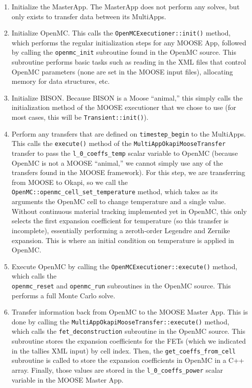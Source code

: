 \documentclass[10pt]{article}
\numberwithin{equation}{section} %
\begin{document}
\begin{enumerate}
\item Initialize the MasterApp. The MasterApp does not perform any solves, but only exists to transfer data between its MultiApps.
\item Initialize OpenMC. This calls the {\tt OpenMCExecutioner::init()} method, which performs the regular initialization steps for any MOOSE App, followed by calling the {\tt openmc\_init} subroutine found in the OpenMC source. This subroutine performs basic tasks such as reading in the XML files that control OpenMC parameters (none are set in the MOOSE input files), allocating memory for data structures, etc.
\item Initialize BISON. Because BISON is a Moose ``animal,'' this simply calls the initialization method of the MOOSE executioner that we chose to use (for most cases, this will be {\tt Transient::init()}).
\item Perform any transfers that are defined on {\tt timestep\_begin} to the MultiApps. This calls the {\tt execute()} method of the {\tt MultiAppOkapiMooseTransfer} transfer to pass the {\tt l\_0\_coeffs\_temp} scalar variable to OpenMC (because OpenMC is not a MOOSE ``animal,'' we cannot simply use any of the transfers found in the MOOSE framework). For this step, we are transferring from MOOSE to Okapi, so we call the {\tt OpenMC::openmc\_cell\_set\_temperature} method, which takes as its arguments the OpenMC cell to change temperature and a single value. Without continuous material tracking implemented yet in OpenMC, this only selects the first expansion coefficient for temperature (so this transfer is incomplete), essentially performing a zeroth-order Legendre and Zernike expansion. This is where an initial condition on temperature is applied in OpenMC.
\item Execute OpenMC by calling the {\tt OpenMCExecutioner::execute()} method, which calls the \\{\tt openmc\_reset} and {\tt openmc\_run} subroutines in the OpenMC source. This performs a full Monte Carlo solve.
\item Transfer information back from OpenMC to the MOOSE Master App. This is done by calling the {\tt MultiAppOkapiMooseTransfer::execute()} method, which calls the {\tt fet\_deconstruction} subroutine in the OpenMC source. This subroutine stores the expansion coefficients for the FETs (which we indicated in the tallies XML input) by cell index. Then, the {\tt get\_coeffs\_from\_cell} subroutine is called to store the expansion coefficients in OpenMC in a C++ array. Finally, those values are stored in the {\tt l\_0\_coeffs\_power} scalar variable in the MOOSE Master App.

\end{enumerate}
\end{document}
